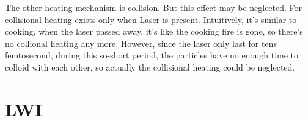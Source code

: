 The other heating mechanism is collision. But this effect may be neglected.
For collisional heating exists only when Laser is
present. Intuitively, it's similar to cooking, when the laser passed
away, it's like the cooking fire is gone, so there's no collional
heating any more. However, since the laser only last for tens
femtosecond, during this so-short period, the particles have no enough
time to colloid with each other, so actually the collisional heating
could be neglected.
\section{LWI}


